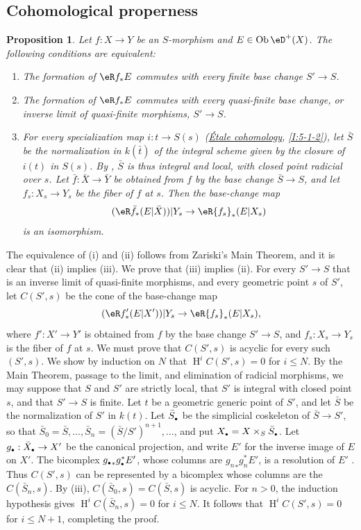 \documentclass[12pt,oneside,english]{smfbook}
\DeclareMathOperator{\h}{H}
\DeclareMathOperator{\ob}{Ob}
\newtheorem{proposition}[subsubsection]{Proposition}
\let\oldbullet\bullet
\renewcommand{\bullet}{\textnormal{\tiny$\oldbullet$}}
\begin{document}
\subsection{Cohomological properness}\label{VII:5-1}

\begin{proposition}\label{VII:5-1-1}
Let $f:X\to Y$ be an $S$-morphism and $E\in\ob\eD^+(X)$. The following conditions are equivalent:
\begin{enumerate}[\indent (i)]
  \item The formation of $\eR f_\ast E$ commutes with every finite base change $S'\to S$.
  \item The formation of $\eR f_\ast E$ commutes with every quasi-finite base change, or inverse limit of quasi-finite morphisms, $S'\to S$.
  \item For every specialization map $i:t\to S(s)$ (\hyperref[I]{Étale cohomology}, \ref{I:5-1-2}), let $\bar S$ be the normalization in $k(\bar t)$ of the integral scheme given by the closure of $i(t)$ in $S(s)$. By \cite[IV, 6.15.5, 18.6.11, 18.8.16]{ega}, $\bar S$ is thus integral and local, with closed point radicial over $s$. Let $\bar f:\bar X\to\bar Y$ be obtained from $f$ by the base change $\bar S\to S$, and let $f_s:X_s\to Y_s$ be the fiber of $f$ at $s$. Then the base-change map
    \[
      (\eR \bar f_\ast (E|\bar X))|Y_s \to \eR {f_s}_\ast(E|X_s)
    \]
    is an isomorphism.
\end{enumerate}
\end{proposition}

The equivalence of (i) and (ii) follows from Zariski's Main Theorem, and it is clear that (ii) implies (iii). We prove that (iii) implies (ii). For every $S'\to S$ that is an inverse limit of quasi-finite morphisms, and every geometric point $s$ of $S'$, let $C(S',s)$ be the cone of the base-change map
\[
  (\eR f_\ast'(E|X'))|Y_s \to \eR{f_s}_\ast (E|X_s) \text{,}
\]
where $f':X'\to Y'$ is obtained from $f$ by the base change $S'\to S$, and $f_s:X_s\to Y_s$ is the fiber of $f$ at $s$. We must prove that $C(S',s)$ is acyclic for every such $(S',s)$. We show by induction on $N$ that $\h^iC(S',s)=0$ for $i\leqslant N$. By the Main Theorem, passage to the limit, and elimination of radicial morphisms, we may suppose that $S$ and $S'$ are strictly local, that $S'$ is integral with closed point $s$, and that $S'\to S$ is finite. Let $t$ be a geometric generic point of $S'$, and let $\bar S$ be the normalization of $S'$ in $k(t)$. Let $\bar S_\bullet$ be the simplicial coskeleton of $\bar S\to S'$, so that $\bar S_0=\bar S,\ldots,\bar S_n=(\bar S/S')^{n+1},\ldots$, and put $X_\bullet=X\times_S\bar S_\bullet$. Let $g_\bullet:\bar X_\bullet\to X'$ be the canonical projection, and write $E'$ for the inverse image of $E$ on $X'$. The bicomplex ${g_\bullet}_\ast g_\bullet^\ast E'$, whose columns are ${g_n}_\ast g_n^\ast E'$, is a resolution of $E'$ \cite[VIII, 8]{sga4}. Thus $C(S',s)$ can be represented by a bicomplex whose columns are the $C(\bar S_n,s)$. By (iii), $C(\bar S_0,s)=C(\bar S,s)$ is acyclic. For $n>0$, the induction hypothesis gives $\h^iC(\bar S_n,s)=0$ for $i\leqslant N$. It follows that $\h^iC(S',s)=0$ for $i\leqslant N+1$, completing the proof.
\end{document}
